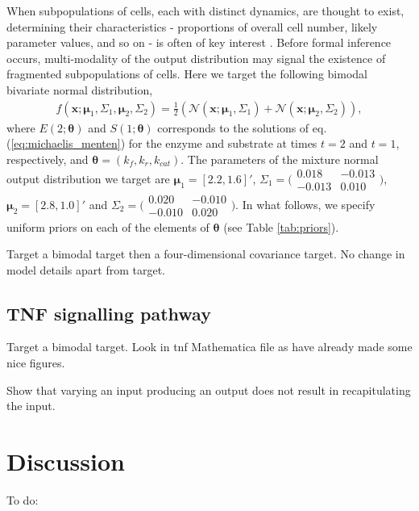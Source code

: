 \documentclass[10pt,letterpaper]{article}
\begin{document}
When subpopulations of cells, each with distinct dynamics, are thought to exist, determining their characteristics - proportions of overall cell number, likely parameter values, and so on - is often of key interest \cite{hasenauer2011identification,loos2018hierarchical}. Before formal inference occurs, multi-modality of the output distribution may signal the existence of fragmented subpopulations of cells. Here we target the following bimodal bivariate normal distribution,
%
\begin{align}
f(\boldsymbol{x}; \boldsymbol{\mu}_1,\Sigma_1, \boldsymbol{\mu}_2, \Sigma_2) = \frac{1}{2}\left(\mathcal{N}(\boldsymbol{x}; \boldsymbol{\mu}_1,\Sigma_1) + \mathcal{N}(\boldsymbol{x}; \boldsymbol{\mu}_2,\Sigma_2)\right),
\end{align}
%
where $E(2; \boldsymbol{\theta})$ and $S(1; \boldsymbol{\theta})$ corresponds to the solutions of eq. (\ref{eq:michaelis_menten}) for the enzyme and substrate at times $t=2$ and $t=1$, respectively, and $\boldsymbol{\theta}=(k_f,k_r,k_{cat})$. The parameters of the mixture normal output distribution we target are $\boldsymbol{\mu}_1=[2.2, 1.6]'$, $\Sigma_1 = \bigl( \begin{smallmatrix}0.018 & -0.013\\ -0.013 & 0.010\end{smallmatrix}\bigr)$, $\boldsymbol{\mu}_2=[2.8, 1.0]'$ and $\Sigma_2=( \begin{smallmatrix}0.020 & -0.010\\ -0.010 & 0.020\end{smallmatrix}\bigr)$. In what follows, we specify uniform priors on each of the elements of $\boldsymbol{\theta}$ (see Table \ref{tab:priors}).



Target a bimodal target then a four-dimensional covariance target. No change in model details apart from target.

\subsection{TNF signalling pathway}
Target a bimodal target. Look in tnf Mathematica file as have already made some nice figures.

Show that varying an input producing an output does not result in recapitulating the input.


\section{Discussion}
\label{sec:discussion}
To do:
\end{document}
